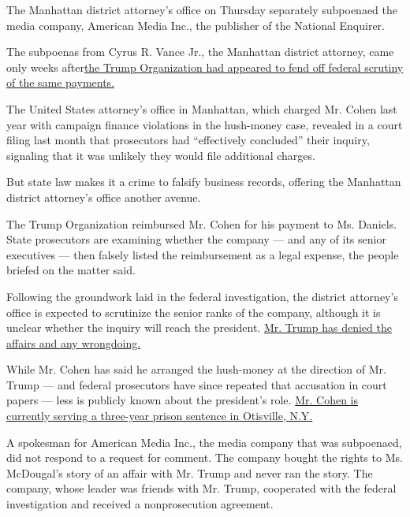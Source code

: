 The Manhattan district attorney's office on Thursday separately
subpoenaed the media company, American Media Inc., the publisher of the
National Enquirer.

The subpoenas from Cyrus R. Vance Jr., the Manhattan district attorney,
came only weeks
after\href{https://www.nytimes3xbfgragh.onion/2019/07/18/nyregion/stormy-daniels-michael-cohen-documents.html}{the
Trump Organization had appeared to fend off federal scrutiny of the same
payments.}

The United States attorney's office in Manhattan, which charged Mr.
Cohen last year with campaign finance violations in the hush-money case,
revealed in a court filing last month that prosecutors had ``effectively
concluded'' their inquiry, signaling that it was unlikely they would
file additional charges.

But state law makes it a crime to falsify business records, offering the
Manhattan district attorney's office another avenue.

The Trump Organization reimbursed Mr. Cohen for his payment to Ms.
Daniels. State prosecutors are examining whether the company --- and any
of its senior executives --- then falsely listed the reimbursement as a
legal expense, the people briefed on the matter said.

Following the groundwork laid in the federal investigation, the district
attorney's office is expected to scrutinize the senior ranks of the
company, although it is unclear whether the inquiry will reach the
president.
\href{https://www.nytimes3xbfgragh.onion/2018/05/04/us/politics/trump-hush-payment-stormy-daniels.html?module=inline}{Mr.
Trump has denied the affairs and any wrongdoing.}

While Mr. Cohen has said he arranged the hush-money at the direction of
Mr. Trump --- and federal prosecutors have since repeated that
accusation in court papers --- less is publicly known about the
president's role.
\href{https://www.nytimes3xbfgragh.onion/2018/12/12/nyregion/michael-cohen-sentence-trump.html?module=inline}{Mr.
Cohen is currently serving a three-year prison sentence in Otisville,
N.Y.}

A spokesman for American Media Inc., the media company that was
subpoenaed, did not respond to a request for comment. The company bought
the rights to Ms. McDougal's story of an affair with Mr. Trump and never
ran the story. The company, whose leader was friends with Mr. Trump,
cooperated with the federal investigation and received a nonprosecution
agreement.

